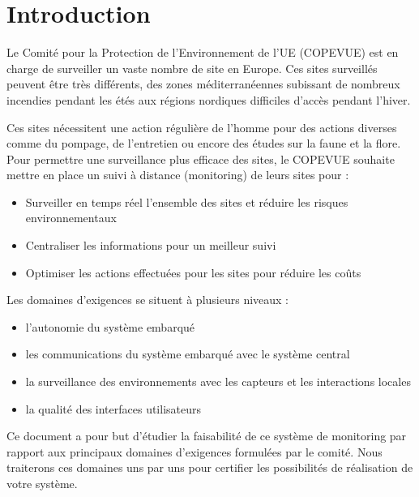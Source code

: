 \section{Introduction}

Le Comité pour la Protection de l'Environnement de l'UE (COPEVUE) est en charge de surveiller un vaste nombre de site en Europe. Ces sites surveillés peuvent être très différents, des zones méditerranéennes subissant de nombreux incendies pendant les étés aux régions nordiques difficiles d'accès pendant l'hiver. 

Ces sites nécessitent une action régulière de l'homme pour des actions diverses comme du pompage, de l'entretien ou encore des études sur la faune et la flore. Pour permettre une surveillance plus efficace des sites, le COPEVUE souhaite mettre en place un suivi à distance (monitoring) de leurs sites pour : 

\begin{itemize}
\item Surveiller en temps réel l'ensemble des sites et réduire les risques environnementaux
\item Centraliser les informations pour un meilleur suivi
\item Optimiser les actions effectuées pour les sites pour réduire les coûts
\end{itemize}

Les domaines d'exigences se situent à plusieurs niveaux : 

\begin{itemize}
\item l'autonomie du système embarqué
\item les communications du système embarqué avec le système central
\item la surveillance des environnements avec les capteurs et les interactions locales
\item la qualité des interfaces utilisateurs
\end{itemize}

Ce document a pour but d'étudier la faisabilité de ce système de monitoring par rapport aux principaux domaines d'exigences formulées par le comité. Nous traiterons ces domaines uns par uns pour certifier les possibilités de réalisation de votre système.

\vfill
\pagebreak
